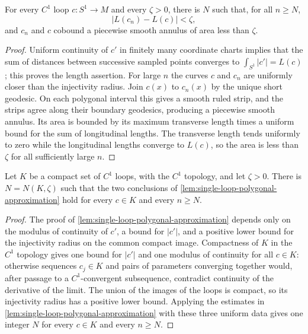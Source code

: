 \begin{theorem}
\label{lem:single-loop-polygonal-approximation}
\notready
For every $C^1$ loop $c\colon S^1\to M$ and every $\zeta>0$, there is
$N$ such that, for all $n\ge N$,
\[
 |L(c_n)-L(c)|<\zeta,
\]
and $c_n$ and $c$ cobound a piecewise smooth annulus of area less than
$\zeta$.
\end{theorem}
\begin{proof}
Uniform continuity of $c'$ in finitely many coordinate charts implies that
the sum of distances between successive sampled points converges to
$\int_{S^1}|c'|=L(c)$; this proves the length assertion.  For large $n$ the
curves $c$ and $c_n$ are uniformly closer than the injectivity radius.  Join
$c(x)$ to $c_n(x)$ by the unique short geodesic.  On each polygonal interval
this gives a smooth ruled strip, and the strips agree along their boundary
geodesics, producing a piecewise smooth annulus.  Its area is bounded by its
maximum transverse length times a uniform bound for the sum of longitudinal
lengths.  The transverse length tends uniformly to zero while the
longitudinal lengths converge to $L(c)$, so the area is less than $\zeta$
for all sufficiently large $n$.
\end{proof}

\begin{theorem}
\label{lem:compact-family-polygonal-approximation}
\notready
Let $K$ be a compact set of $C^1$ loops, with the $C^1$ topology, and let
$\zeta>0$.  There is $N=N(K,\zeta)$ such that the two conclusions of
\ref{lem:single-loop-polygonal-approximation} hold for every $c\in K$ and
every $n\ge N$.
\end{theorem}
\begin{proof}
The proof of \ref{lem:single-loop-polygonal-approximation} depends only on the
modulus of continuity
of $c'$, a bound for $|c'|$, and a positive lower bound for the injectivity
radius on the common compact image.  Compactness of $K$ in the $C^1$ topology
gives one bound for $|c'|$ and one modulus of continuity for all $c\in K$:
otherwise sequences $c_j\in K$ and pairs of parameters converging together
would, after passage to a $C^1$-convergent subsequence, contradict continuity
of the derivative of the limit.  The union of the images of the loops is
compact, so its injectivity radius has a positive lower bound.  Applying the
estimates in \ref{lem:single-loop-polygonal-approximation} with these three
uniform data gives one
integer $N$ for every $c\in K$ and every $n\ge N$.
\end{proof}

